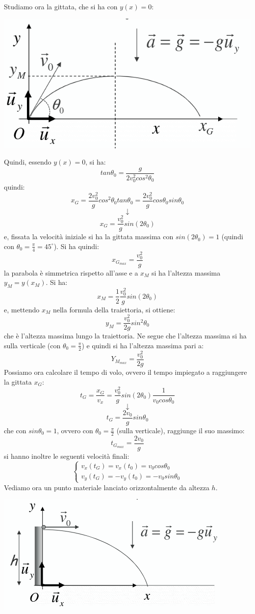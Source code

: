 \documentclass[a4paper,12pt, oneside]{book}
\begin{document}
\newpage
Studiamo ora la gittata, che si ha con $y(x)=0$:
\begin{center}
\includegraphics[scale=0.4]{img/par3.png}
\end{center}
Quindi, essendo $y(x)=0$, si ha:
$$tan\theta_0=\frac{g}{2v_0^2cos^2\theta_0}$$
quindi:
$$x_G=\frac{2v_0^2}{g}cos^2\theta_0 tan\theta_0=\frac{2v_0^2}{g}cos\theta_0 sin\theta_0$$
$$\downarrow$$
$$x_G=\frac{v_0^2}{g}sin(2\theta_0)$$
e, fissata la velocità iniziale si ha la gittata massima con $sin(2\theta_0)=1$ (quindi con $\theta_0=\frac{\pi}{4}=45^{\circ}$). Si ha quindi:
$$x_{G_{max}}=\frac{v_0^2}{g}$$
la parabola è simmetrica rispetto all'asse e a $x_M$ si ha l'altezza massima $y_M=y(x_M)$. Si ha:
$$x_M=\frac{1}{2}\frac{v_0^2}{g}sin(2\theta_0)$$
e, mettendo $x_M$ nella formula della traiettoria, si ottiene:
$$y_M=\frac{v_0^2}{2g}sin^2\theta_0$$
che è l'altezza massima lungo la traiettoria.
Ne segue che l'altezza massima si ha sulla verticale (con $\theta_0=\frac{\pi}{2}$) e quindi si ha l'altezza massima pari a:
$$Y_{M_{max}}=\frac{v_0^2}{2g}$$
Possiamo ora calcolare il tempo di volo, ovvero il tempo impiegato a raggiungere la gittata $x_G$:
$$t_G=\frac{x_G}{v_x}=\frac{v_0^2}{g}sin(2\theta_0)\frac{1}{v_0cos\theta_0}$$
$$\downarrow$$
$$t_G=\frac{2v_0}{g}sin\theta_0$$
che con $sin\theta_0=1$, ovvero con $\theta_0=\frac{\pi}{2}$ (sulla verticale), raggiunge il suo massimo:
$$t_{G_{max}}=\frac{2v_0}{g}$$
si hanno inoltre le seguenti velocità finali:
$$\begin{cases}
v_x(t_G)=v_x(t_0)=v_0cos\theta_0\\
v_y(t_G)=-v_y(t_0)=-v_0sin\theta_0
\end{cases}$$
Vediamo ora un punto materiale lanciato orizzontalmente da altezza $h$.
\begin{center}
\includegraphics[scale=0.6]{img/ori.png}
\end{center}
\end{document}

